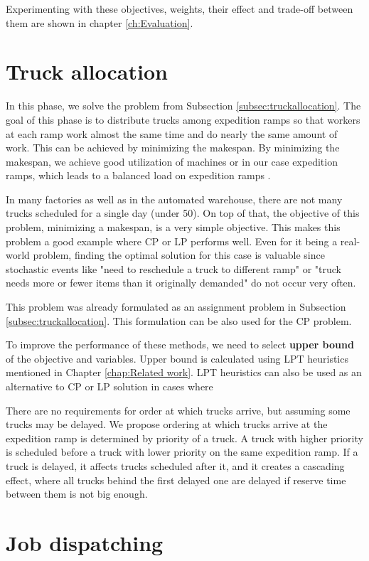 \documentclass{ctuthesis}
\begin{document}
 Experimenting with these objectives, weights, their effect and trade-off between them are shown in chapter \ref{ch:Evaluation}.


\section{Truck allocation}

In this phase, we solve the problem from Subsection \ref{subsec:truckallocation}. The goal of this phase is to distribute trucks among expedition ramps so that workers at each ramp work almost the same time and do nearly the same amount of work. This can be achieved by minimizing the makespan. By minimizing the makespan, we achieve good utilization of machines or in our case expedition ramps, which leads to a balanced load on expedition ramps \cite{pinedo}. 

In many factories as well as in the automated warehouse, there are not many trucks scheduled for a single day (under 50). On top of that, the objective of this problem, minimizing a makespan, is a very simple objective. This makes this problem a good example where CP or LP performs well. Even for it being a real-world problem, finding the optimal solution for this case is valuable since stochastic events like "need to reschedule a truck to different ramp" or "truck needs more or fewer items than it originally demanded" do not occur very often.

This problem was already formulated as an assignment problem in Subsection \ref{subsec:truckallocation}. This formulation can be also used for the CP problem.

To improve the performance of these methods, we need to select \textbf{upper bound} of the objective and variables. Upper bound is calculated using LPT heuristics mentioned in Chapter \ref{chap:Related work}. LPT heuristics can also be used as an alternative to CP or LP solution in cases where 

There are no requirements for order at which trucks arrive, but assuming some trucks may be delayed. We propose ordering at which trucks arrive at the expedition ramp is determined by priority of a truck. A truck with higher priority is scheduled before a truck with lower priority on the same expedition ramp. If a truck is delayed, it affects trucks scheduled after it, and it creates a cascading effect, where all trucks behind the first delayed one are delayed if reserve time between them is not big enough. 

\section{Job dispatching}
\end{document}
